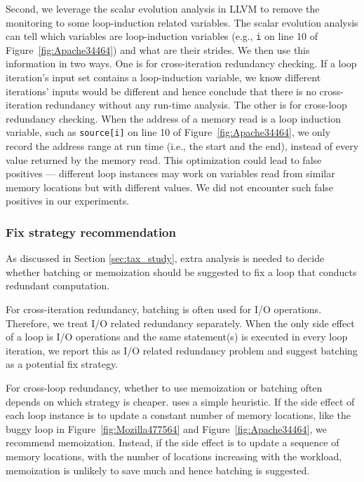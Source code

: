 Second, we leverage the scalar evolution analysis in LLVM to remove the 
monitoring to some loop-induction related variables.
The scalar evolution analysis can tell which variables are
loop-induction variables (e.g., \texttt{i} on line 10
of Figure~\ref{fig:Apache34464}) and what are their strides. 
We then use this information in two ways. 
One is for cross-iteration redundancy checking.
If a loop iteration's input set contains a loop-induction
variable, we know different iterations' inputs would be different and 
hence conclude that there is no cross-iteration redundancy without any
run-time analysis. 
The other is for cross-loop redundancy checking.
When the address of a memory read is a loop induction variable, such as
\texttt{source[i]} on line 10 of Figure~\ref{fig:Apache34464},
we only record the address range at run time (i.e., the start and the
end), instead of every value returned by the memory read.
This optimization could lead to false positives ---
different loop instances may work on variables read from
similar memory locations but with different values.
We did not encounter such false positives in our experiments.


\subsubsection{Fix strategy recommendation}
\label{sec:redundant_fix}
As discussed in Section \ref{sec:tax_study}, extra analysis is needed to
decide whether batching or memoization should be suggested to fix a 
loop that conducts redundant computation.

For cross-iteration redundancy, batching is often used for
I/O operations.
Therefore, we treat I/O related redundancy separately.
When the only side effect of a loop is I/O operations
and the same statement(s) is executed in every loop iteration, we report this
as I/O related redundancy problem and suggest batching as a potential fix
strategy. 

For cross-loop redundancy, whether to use memoization or batching often
depends on which strategy is cheaper. \Tool uses a simple
heuristic. If 
the side effect of each loop instance is to update 
a constant number of memory locations, like the 
buggy loop in Figure~\ref{fig:Mozilla477564} and Figure~\ref{fig:Apache34464}, 
we recommend memoization. Instead, if the side effect is to update
a sequence of memory locations, with the number of locations increasing
with the workload, memoization is unlikely to save much and
hence batching is suggested.

